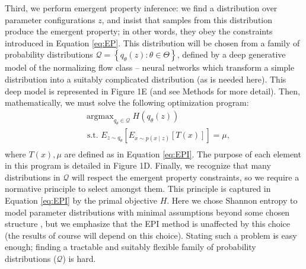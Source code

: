 \documentclass[11pt]{article}
\DeclareMathOperator*{\argmax}{argmax}
\begin{document}
Third, we perform emergent property inference: we find a distribution over parameter configurations $z$, and insist that samples from this distribution produce the emergent property; in other words, they obey the constraints introduced in Equation \ref{eq:EP}.  
This distribution will be chosen from a family of probability distributions $\mathcal{Q} = \left\{ q_\theta(z) : \theta \in \Theta \right\}$, defined by a deep generative model
of the normalizing flow class \cite{rezende2015variational, dinh2016density, papamakarios2017masked} -- neural networks which transform a simple distribution into a suitably complicated distribution (as is needed here).  
This deep model is represented in Figure 1E (and see Methods for more detail).  
Then, mathematically, we must solve the following optimization program: 
 \begin{equation} \label{eq:EPI}
\begin{split}
&\argmax_{q_\theta \in \mathcal{Q}} H(q_\theta(z)) \\
 &\text{  s.t.  } E_{z \sim q_\theta}\left[ E_{x\sim p(x \mid z)}\left[T(x)\right] \right] = \mu, \\
\end{split}
\end{equation}
where $T(x), \mu$ are defined as in Equation \ref{eq:EPI}.   The purpose of each element in this program is detailed in Figure 1D.
Finally, we recognize that many distributions in $\mathcal{Q}$ will respect the emergent property constraints, so we require a normative principle to select amongst them.  
This principle is captured in Equation \ref{eq:EPI} by the primal objective $H$.  
Here we chose Shannon entropy to model parameter distributions with minimal assumptions beyond some chosen structure \cite{jaynes1957information, elsayed2017structure, loaiza2017maximum, savin2017maximum}, but we emphasize that the EPI method is unaffected by this choice (the results of course will depend on this choice).  
Stating such a problem is easy enough; finding a tractable and suitably flexible family of probability distributions ($\mathcal{Q}$) is hard.  
\end{document}
